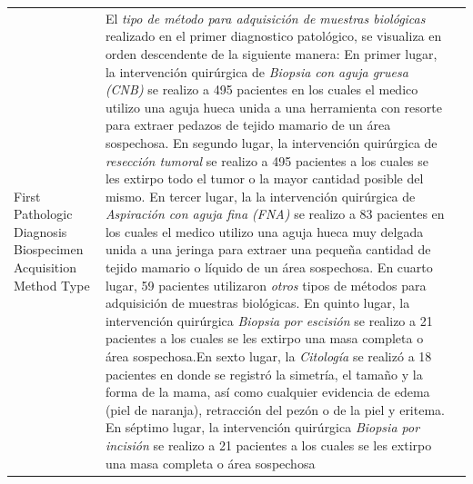 \begin{table}[!htb]
	\footnotesize
	\begin{threeparttable}
		\begin{tabular}{p{2.5cm} p{7.5cm} p{6.5cm}} \toprule
			First Pathologic Diagnosis Biospecimen Acquisition Method Type
			& El \textit{tipo de método para adquisición de muestras biológicas} realizado en el primer diagnostico patológico, se visualiza en orden descendente de la siguiente manera: En primer lugar, la intervención quirúrgica de \textit{Biopsia con aguja gruesa (CNB)} se realizo a 495 pacientes en los cuales el medico utilizo una aguja hueca unida a una herramienta con resorte para extraer pedazos de tejido mamario de un área sospechosa. En segundo lugar, la intervención quirúrgica de \textit{resección tumoral} se realizo a 495 pacientes a los cuales se les extirpo todo el tumor o la mayor cantidad posible del mismo. En tercer lugar, la la intervención quirúrgica de \textit{Aspiración con aguja fina (FNA)} se realizo a 83 pacientes en los cuales el medico utilizo una aguja hueca muy delgada unida a una jeringa para extraer una pequeña cantidad de tejido mamario o líquido de un área sospechosa. En cuarto lugar, 59 pacientes utilizaron \textit{otros} tipos de métodos para adquisición de muestras biológicas. En quinto lugar, la intervención quirúrgica \textit{Biopsia por escisión} se realizo a 21 pacientes a los cuales se les extirpo una masa completa o área sospechosa.En sexto lugar, la \textit{Citología} se realizó a 18 pacientes en donde se registró la simetría, el tamaño y la forma de la mama, así como cualquier evidencia de edema (piel de naranja), retracción del pezón o de la piel y eritema. En séptimo lugar, la intervención quirúrgica \textit{Biopsia por incisión} se realizo a 21 pacientes a los cuales se les extirpo una masa completa o área sospechosa

\end{tabular}
\end{threeparttable}
\end{table}
